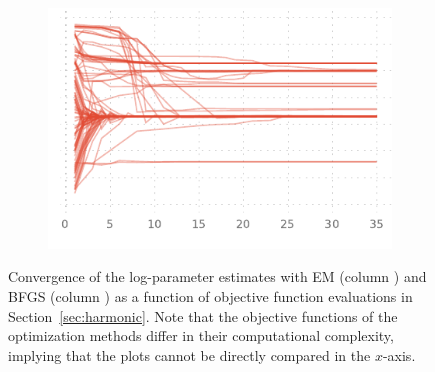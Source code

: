 \begin{figure}[htbp]
{\begin{subfigure}[t]{0.5\textwidth+0.4in}
    \end{subfigure}%
    \begin{subfigure}[t]{0.5\textwidth+0.4in}%
		\includegraphics{img/harmonic_bf_lqx}%
    \end{subfigure}}%
    \caption{Convergence of the log-parameter estimates with 
    EM (column ) and 
    BFGS (column )
    as a function of objective function evaluations in Section~\ref{sec:harmonic}.     
    Note that the objective functions of the optimization methods differ in their computational complexity, 
    implying that the plots cannot be directly compared in the $x$-axis. }
    \label{fig:harmonic_est}
 \end{figure}

